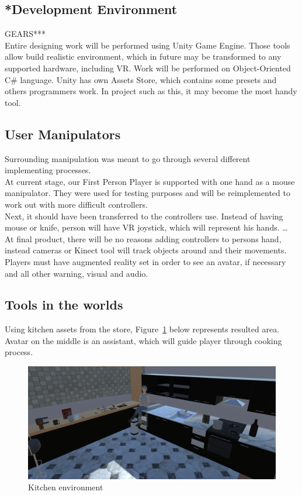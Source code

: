 \documentclass[18pt]{article}
\numberwithin{equation}{section} %
\numberwithin{figure}{section} %
\numberwithin{table}{section} %
\begin{document}
	\subsection{*Development Environment}
	GEARS***\\
	Entire designing work will be performed using Unity Game Engine. Those tools allow build realistic environment, which in future may be transformed to any supported hardware, including VR. Work will be performed on Object-Oriented C# language. Unity has own Assets Store, which contains some presets and others programmers work. In project such as this, it may become the most handy tool.
	\subsection{User Manipulators}
	Surrounding manipulation was meant to go through several different implementing processes.\\	
	At current stage, our First Person Player is supported with one hand as a mouse manipulator. They were used for testing purposes and will be reimplemented to work out with more difficult controllers. \\
	
	Next, it should have been transferred to the controllers use. Instead of having mouse or knife, person will have VR joystick, which will represent his hands. \ldots \\
	
	At final product, there will be no reasons adding controllers to persons hand, instead cameras or Kinect tool will track objects around and their movements.  Players must have augmented reality set in order to see an avatar, if necessary and all other warning, visual and audio.\\
	
	
	\subsection{Tools in the worlds}
	Using kitchen assets from the store, Figure~\ref{fig:kitchen} below represents resulted area. Avatar on the middle is an assistant, which will guide player through cooking process. 
	\begin{figure}[H]
		\centering
		\includegraphics[width=0.7\linewidth]{images/kitchen}
		\caption{Kitchen environment}
		\label{fig:kitchen}
	\end{figure}
	
\end{document}
